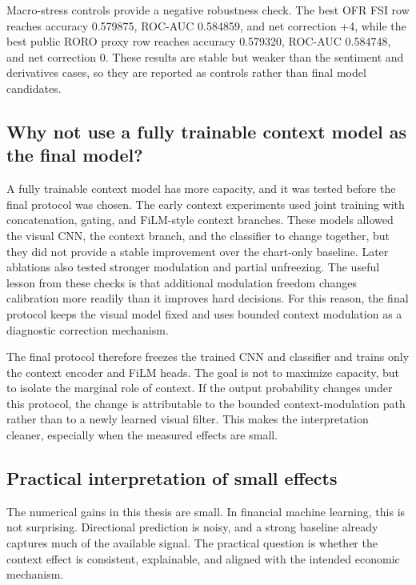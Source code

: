 \documentclass[14pt,a4paper]{extarticle}
\begin{document}
Macro-stress controls provide a negative robustness check. The best OFR FSI row reaches accuracy 0.579875, ROC-AUC 0.584859, and net correction +4, while the best public RORO proxy row reaches accuracy 0.579320, ROC-AUC 0.584748, and net correction 0. These results are stable but weaker than the sentiment and derivatives cases, so they are reported as controls rather than final model candidates.

\subsection{Why not use a fully trainable context model as the final model?}

A fully trainable context model has more capacity, and it was tested before the final protocol was chosen. The early context experiments used joint training with concatenation, gating, and FiLM-style context branches. These models allowed the visual CNN, the context branch, and the classifier to change together, but they did not provide a stable improvement over the chart-only baseline. Later ablations also tested stronger modulation and partial unfreezing. The useful lesson from these checks is that additional modulation freedom changes calibration more readily than it improves hard decisions. For this reason, the final protocol keeps the visual model fixed and uses bounded context modulation as a diagnostic correction mechanism.

The final protocol therefore freezes the trained CNN and classifier and trains only the context encoder and FiLM heads. The goal is not to maximize capacity, but to isolate the marginal role of context. If the output probability changes under this protocol, the change is attributable to the bounded context-modulation path rather than to a newly learned visual filter. This makes the interpretation cleaner, especially when the measured effects are small.

\subsection{Practical interpretation of small effects}

The numerical gains in this thesis are small. In financial machine learning, this is not surprising. Directional prediction is noisy, and a strong baseline already captures much of the available signal. The practical question is whether the context effect is consistent, explainable, and aligned with the intended economic mechanism.
\end{document}
